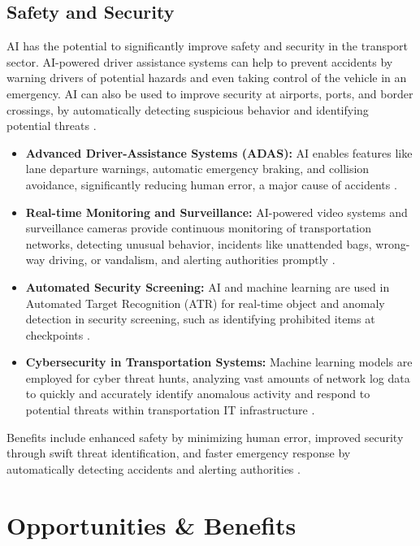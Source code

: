 \subsection{Safety and Security}
AI has the potential to significantly improve safety and security in the transport sector. AI-powered driver assistance systems can help to prevent accidents by warning drivers of potential hazards and even taking control of the vehicle in an emergency. AI can also be used to improve security at airports, ports, and border crossings, by automatically detecting suspicious behavior and identifying potential threats \cite{isalkar2024artificial}.
\begin{itemize}
    \item \textbf{Advanced Driver-Assistance Systems (ADAS):} AI enables features like lane departure warnings, automatic emergency braking, and collision avoidance, significantly reducing human error, a major cause of accidents \cite{AppInventiv_Safety, TLIMagazine_Safety}.
    \item \textbf{Real-time Monitoring and Surveillance:} AI-powered video systems and surveillance cameras provide continuous monitoring of transportation networks, detecting unusual behavior, incidents like unattended bags, wrong-way driving, or vandalism, and alerting authorities promptly \cite{Praxie_Safety, DigitalDefynd_Safety}.
    \item \textbf{Automated Security Screening:} AI and machine learning are used in Automated Target Recognition (ATR) for real-time object and anomaly detection in security screening, such as identifying prohibited items at checkpoints \cite{DHS_Security}.
    \item \textbf{Cybersecurity in Transportation Systems:} Machine learning models are employed for cyber threat hunts, analyzing vast amounts of network log data to quickly and accurately identify anomalous activity and respond to potential threats within transportation IT infrastructure \cite{SecurityJournalUK_Security}.
\end{itemize}
Benefits include enhanced safety by minimizing human error, improved security through swift threat identification, and faster emergency response by automatically detecting accidents and alerting authorities \cite{Prismetric_Safety, Integrio_Safety}.

\section{Opportunities \& Benefits}

